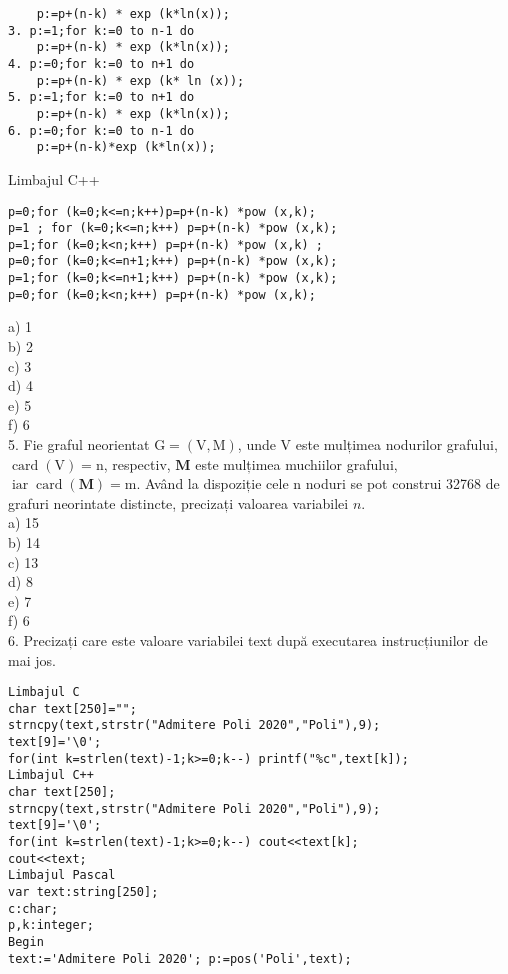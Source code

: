 \begin{verbatim}
    p:=p+(n-k) * exp (k*ln(x));
3. p:=1;for k:=0 to n-1 do
    p:=p+(n-k) * exp (k*ln(x));
4. p:=0;for k:=0 to n+1 do
    p:=p+(n-k) * exp (k* ln (x));
5. p:=1;for k:=0 to n+1 do
    p:=p+(n-k) * exp (k*ln(x));
6. p:=0;for k:=0 to n-1 do
    p:=p+(n-k)*exp (k*ln(x));
\end{verbatim}

Limbajul C++

\begin{verbatim}
p=0;for (k=0;k<=n;k++)p=p+(n-k) *pow (x,k);
p=1 ; for (k=0;k<=n;k++) p=p+(n-k) *pow (x,k);
p=1;for (k=0;k<n;k++) p=p+(n-k) *pow (x,k) ;
p=0;for (k=0;k<=n+1;k++) p=p+(n-k) *pow (x,k);
p=1;for (k=0;k<=n+1;k++) p=p+(n-k) *pow (x,k);
p=0;for (k=0;k<n;k++) p=p+(n-k) *pow (x,k);
\end{verbatim}

a) 1\\
b) 2\\
c) 3\\
d) 4\\
e) 5\\
f) 6\\
5. Fie graful neorientat $\mathrm{G}=(\mathrm{V}, \mathrm{M})$, unde V este mulțimea nodurilor grafului, $\operatorname{card}(\mathrm{V})=\mathrm{n}$, respectiv, $\mathbf{M}$ este mulțimea muchiilor grafului, $\operatorname{iar} \operatorname{card}(\mathbf{M})=\mathrm{m}$. Având la dispoziție cele n noduri se pot construi 32768 de grafuri neorintate distincte, precizați valoarea variabilei $n$.\\
a) 15\\
b) 14\\
c) 13\\
d) 8\\
e) 7\\
f) 6\\
6. Precizați care este valoare variabilei text după executarea instrucțiunilor de mai jos.

\begin{verbatim}
Limbajul C
char text[250]="";
strncpy(text,strstr("Admitere Poli 2020","Poli"),9);
text[9]='\0';
for(int k=strlen(text)-1;k>=0;k--) printf("%c",text[k]);
Limbajul C++
char text[250];
strncpy(text,strstr("Admitere Poli 2020","Poli"),9);
text[9]='\0';
for(int k=strlen(text)-1;k>=0;k--) cout<<text[k];
cout<<text;
Limbajul Pascal
var text:string[250];
c:char;
p,k:integer;
Begin
text:='Admitere Poli 2020'; p:=pos('Poli',text);
\end{verbatim}

